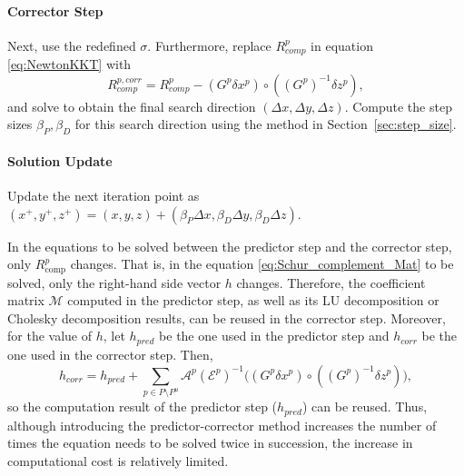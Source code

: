 \paragraph{Corrector Step}
Next, use the redefined $\sigma$. Furthermore, replace $R^p_{comp}$ in equation \eqref{eq:NewtonKKT} with
\[R^{p, corr}_{comp}=R^p_{comp}-(G^p \delta x^p)\circ((G^p)^{-1} \delta z^p),\]
and solve to obtain the final search direction $(\Delta x, \Delta y, \Delta z)$.
Compute the step sizes $\beta_P, \beta_D$ for this search direction using the method in Section~\ref{sec:step_size}.

\paragraph{Solution Update}
Update the next iteration point as $(x^+, y^+, z^+) = (x, y, z) + (\beta_P \Delta x, \beta_D \Delta y, \beta_D \Delta z)$.

In the equations to be solved between the predictor step and the corrector step, only $R^p_{\mathrm{comp}}$ changes.
That is, in the equation \eqref{eq:Schur_complement_Mat} to be solved, only the right-hand side vector $h$ changes.
Therefore, the coefficient matrix $\mathcal{M}$ computed in the predictor step, as well as its LU decomposition or Cholesky decomposition results, can be reused in the corrector step.
Moreover, for the value of $h$, let $h_{pred}$ be the one used in the predictor step and $h_{corr}$ be the one used in the corrector step.
Then,
\[h_{corr}=h_{pred} + \sum_{p\in P\setminus P^u} \mathcal{A}^p (\mathcal{E}^p)^{-1} \big((G^p \delta x^p) \circ ((G^p)^{-1} \delta z^p) \big),\]
so the computation result of the predictor step ($h_{pred}$) can be reused.
Thus, although introducing the predictor-corrector method increases the number of times the equation needs to be solved twice in succession, the increase in computational cost is relatively limited.


\medskip